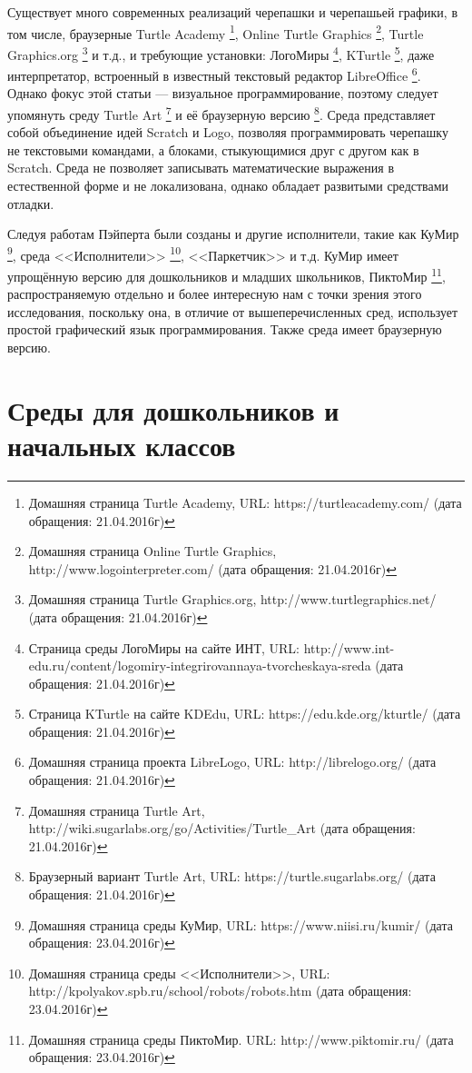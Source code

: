 \documentclass[a5paper]{article}
\begin{document}
Существует много современных реализаций черепашки и черепашьей графики, в том числе, браузерные Turtle Academy%
\footnote{Домашняя страница Turtle Academy, URL:  https://turtleacademy.com/ (дата обращения: 21.04.2016г)}, 
Online Turtle Graphics%
\footnote{Домашняя страница Online Turtle Graphics, http://www.logointerpreter.com/ (дата обращения: 21.04.2016г)}, 
Turtle Graphics.org%
\footnote{Домашняя страница Turtle Graphics.org,  http://www.turtlegraphics.net/ (дата обращения: 21.04.2016г)} 
и т.д., и требующие установки: ЛогоМиры%
\footnote{Страница среды ЛогоМиры на сайте ИНТ, 
URL: http://www.int-edu.ru/content/logomiry-integrirovannaya-tvorcheskaya-sreda (дата обращения: 21.04.2016г)}, 
KTurtle%
\footnote{Страница KTurtle на сайте KDEdu, URL: https://edu.kde.org/kturtle/ (дата обращения: 21.04.2016г)}, 
даже интерпретатор, встроенный в известный текстовый редактор LibreOffice%
\footnote{Домашняя страница проекта LibreLogo, URL: http://librelogo.org/ (дата обращения: 21.04.2016г)}. 
Однако фокус этой статьи --- визуальное программирование, поэтому следует упомянуть среду Turtle Art%
\footnote{Домашняя страница Turtle Art,  http://wiki.sugarlabs.org/go/Activities/Turtle\_Art (дата обращения: 21.04.2016г)}
и её браузерную версию%
\footnote{Браузерный вариант Turtle Art, URL: https://turtle.sugarlabs.org/ (дата обращения: 21.04.2016г)}. 
Среда представляет собой объединение 
идей Scratch и Logo, позволяя программировать черепашку не текстовыми командами, а блоками, стыкующимися друг 
с другом как в Scratch. Среда не позволяет записывать математические выражения в естественной форме и 
не локализована, однако обладает развитыми средствами отладки.

Следуя работам Пэйперта были созданы и другие исполнители, такие как КуМир%
\footnote{Домашняя страница среды КуМир, URL: https://www.niisi.ru/kumir/ (дата обращения: 23.04.2016г)}, 
среда <<Исполнители>>%
\footnote{Домашняя страница среды <<Исполнители>>, URL: http://kpolyakov.spb.ru/school/robots/robots.htm 
(дата обращения: 23.04.2016г)}, <<Паркетчик>> и т.д. 
КуМир имеет упрощённую версию для дошкольников и младших школьников, ПиктоМир%
\footnote{Домашняя страница среды ПиктоМир. URL: http://www.piktomir.ru/ (дата обращения: 23.04.2016г)}, 
распространяемую отдельно и более 
интересную нам  с точки зрения этого исследования, поскольку она, в отличие от вышеперечисленных сред, использует 
простой графический язык программирования. Также среда имеет браузерную версию.

\section{Среды для дошкольников и начальных классов}
\label{chapter:kindergarden}
\end{document}
